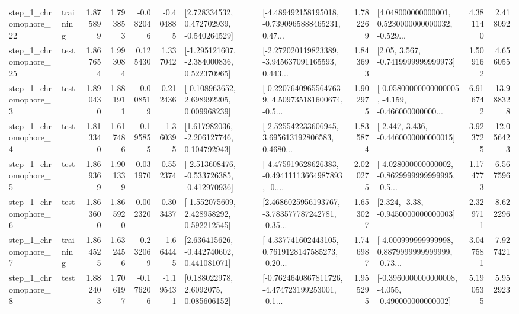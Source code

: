\begin{tabular}{llrrrrllrlrr}
    step\_1\_chromophore\_22 &  training &      1.875899 &    1.793853 &     -0.082046 & -0.404885 &    [2.728334532, 0.472702939, -0.540264529] &  [-4.489492158195018, -0.7390965888465231, 0.47... &       1.782269 &  [4.048000000000001, 0.5230000000000032, -0.529... &            4.381140 &          2.418092 \\
    step\_1\_chromophore\_25 &      test &      1.867654 &    1.993084 &      0.125430 &  1.337042 &   [-1.295121607, -2.384000836, 0.522370965] &  [-2.272020119823389, -3.945637091165593, 0.443... &       1.843693 &                 [2.05, 3.567, -0.7419999999999973] &            1.509162 &          4.656055 \\
     step\_1\_chromophore\_3 &      test &      1.890430 &    1.881911 &     -0.008519 &  0.212436 &    [-0.108963652, 2.698992205, 0.009968239] &  [-0.22076409655647639, 4.509735181600674, -0.5... &       1.902975 &  [-0.05800000000000005, -4.159, -0.466000000000... &            6.916742 &         13.988328 \\
     step\_1\_chromophore\_4 &      test &      1.813340 &    1.617486 &     -0.195855 & -1.360395 &    [1.617982036, -2.206127746, 0.104792943] &  [-2.525542233606945, 3.695613192806583, 0.4680... &       1.835874 &               [-2.447, 3.436, -0.4460000000000015] &            3.923725 &         12.056423 \\
     step\_1\_chromophore\_5 &      test &      1.869369 &    1.901339 &      0.031970 &  0.552374 &  [-2.513608476, -0.533726385, -0.412970936] &  [-4.475919628626383, -0.49411113664987893, -0.... &       2.020275 &  [-4.028000000000002, -0.8629999999999995, -0.5... &            1.174773 &          6.567596 \\
     step\_1\_chromophore\_6 &      test &      1.863600 &    1.865920 &      0.002320 &  0.303437 &    [-1.552075609, 2.428958292, 0.592212545] &  [2.4686025956193767, -3.783577787242781, -0.35... &       1.653027 &                [2.324, -3.38, -0.9450000000000003] &            2.329711 &          8.622296 \\
     step\_1\_chromophore\_7 &  training &      1.864525 &    1.632456 &     -0.232069 & -1.664445 &    [2.636415626, -0.442740602, 0.441081071] &  [-4.337741602443105, 0.7619128147585273, -0.20... &       1.746987 &  [-4.000999999999998, 0.8879999999999999, -0.73... &            3.047581 &          7.927421 \\
     step\_1\_chromophore\_8 &      test &      1.882403 &    1.706197 &     -0.176206 & -1.195431 &       [0.188022978, 2.6092075, 0.085606152] &  [-0.7624640867811726, -4.474723199253001, -0.1... &       1.955295 &  [-0.3960000000000008, -4.055, -0.490000000000002] &            5.190535 &          5.952923 \\

\end{tabular}

